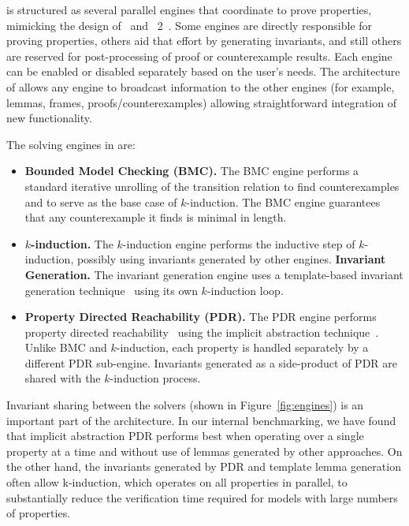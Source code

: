 \jkind is structured as several parallel engines that coordinate to
prove properties, mimicking the design of \kind\ and \kind\ 2~\cite{champion2016cav, kahsai2011pdmc}.
Some engines are directly responsible for proving properties, others aid that effort by generating invariants, and still others are reserved for post-processing of proof or counterexample results. Each engine can be enabled or disabled separately based on the user's needs. The architecture of \jkind allows any engine to broadcast information to the other engines (for example, lemmas, frames, proofs/counterexamples) allowing straightforward integration of new functionality.

The solving engines in \jkind are:

\begin{itemize}
  \item \textbf{Bounded Model Checking (BMC).} The BMC engine performs a standard iterative unrolling of the transition relation to find counterexamples and to serve as the base case of $k$-induction. The BMC engine guarantees that any counterexample it finds is minimal in length.
  \item \textbf{$k$-induction.} The $k$-induction engine performs the inductive step of $k$-induction, possibly using invariants generated by other engines. \textbf{Invariant Generation.} The invariant generation engine uses a template-based invariant generation technique~\cite{kahsai2012nfm} using its own $k$-induction loop.
  \item \textbf{Property Directed Reachability (PDR).} The PDR engine performs property directed reachability~\cite{een2011fmcad} using the implicit abstraction technique~\cite{cimatti2014tacas}. Unlike BMC and $k$-induction, each property is handled separately by a different PDR sub-engine. Invariants generated as a side-product of PDR are shared with the $k$-induction process.
\end{itemize}

Invariant sharing between the solvers (shown in Figure~\ref{fig:engines}) is an important part of the architecture.  In our internal benchmarking, we have found that implicit abstraction PDR performs best when operating over a single property at a time and without use of lemmas generated by other approaches.  On the other hand, the invariants generated by PDR and template lemma generation often allow k-induction, which operates on all properties in parallel, to substantially reduce the verification time required for models with large numbers of properties.  %

